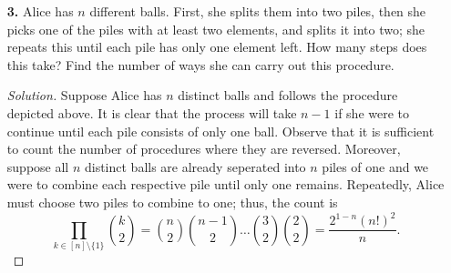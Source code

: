 \documentclass[ 12pt ]{article}
\begin{document}
\begin{enumerate}
		\begin{proof}
			Suppose we have a grid consisting of $m$ and $n$ horizontal and vertical lines respectively.
			\begin{enumerate}
				\item[\textbf{i.}] Observe that counting all rectangles of positive area is identical to counting all pairs of horizontal and vertical lines. Moreover,
					a rectangle can be uniquely represented by the lines that construct it. Then it follows that the number of all possible rectanges must be $\binom{m}{2}\binom{n}{2}$.

				\item[\textbf{ii.}] Let $m = n$. I claim that the count of all rectanges formed by the grid is precisely $\binom{n}{2}^2$. As a base case, let $n=2$, clearly one square
					is formed which is illustrated by $1 = \binom{2}{2}^2$. For the inductive step, suppose we have a grid of $n$ horizontal and $n$ vertical lines with
					$\binom{n}{2}^2$ rectangles. Let us now append both a horizontal and vertical line to the grid. In this new grid, we can see that all previous $\binom{n}{2}^2$
					still remain with the addition of all rectangles formed from the new lines. By inspecting the new grid we can see that $2\binom{n}{2}\binom{n}{1} + \binom{n}{1}^2$
					new rectangles are formed by ensuring one of the new lines are included or both of the new lines are included. Hence, the new count is
					$$\binom{n}{2}^2 + 2\binom{n}{2}\binom{n}{1} + \binom{n}{1}^2 = \left ( \binom{n}{2} + \binom{n}{1} \right )^2 = \binom{n+1}{2}^2.$$
			\end{enumerate}
		\end{proof}


	\item[\textbf{3.}] Alice has $n$ different balls. First, she splits them into two piles, then she picks one of the piles with at least two elements, and splits it into two;
		she repeats this until each pile has only one element left. How many steps does this take? Find the number of ways she can carry out this procedure.

		\begin{proof}[Solution]
			Suppose Alice has $n$ distinct balls and follows the procedure depicted above. It is clear that the process will take $n-1$ if she were to continue until each pile
			consists of only one ball. Observe that it is sufficient to count the number of procedures where they are reversed. Moreover, suppose all $n$ distinct balls are already
			seperated into $n$ piles of one and we were to combine each respective pile until only one remains. Repeatedly, Alice must choose two piles to combine to one; thus, the
			count is $$\prod_{k \in [n] \setminus \{ 1 \}} \binom{k}{2} = \binom{n}{2}\binom{n-1}{2} \hdots \binom{3}{2}\binom{2}{2} = \frac{2^{1-n}(n!)^2}{n}.$$
		\end{proof}



\end{enumerate}
\end{document}
